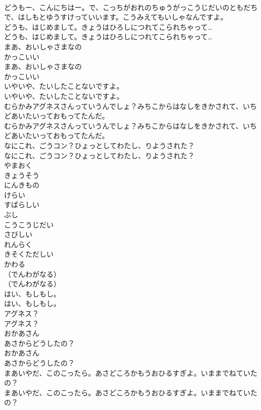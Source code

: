 \documentclass[8pt]{extreport}
\begin{document}
\begin{CJK}{UTF8}{min}
\\	どうもー、こんにちはー。で、こっちがおれのちゅうがっこうじだいのともだちで、はしもとゆうすけっていいます。こうみえてもいしゃなんですよ。
\\	どうも、はじめまして。きょうはひろしにつれてこられちゃって…
\\	どうも、はじめまして。きょうはひろしにつれてこられちゃって…
\\	まあ、おいしゃさまなの
\\	かっこいい
\\	まあ、おいしゃさまなの
\\	かっこいい
\\	いやいや、たいしたことないですよ。
\\	いやいや、たいしたことないですよ。
\\	むらかみアグネスさんっていうんでしょ？みちこからはなしをきかされて、いちどあいたいっておもってたんだ。
\\	むらかみアグネスさんっていうんでしょ？みちこからはなしをきかされて、いちどあいたいっておもってたんだ。
\\	なにこれ、ごうコン？ひょっとしてわたし、りようされた？
\\	なにこれ、ごうコン？ひょっとしてわたし、りようされた？
\\	やまおく
\\	きょうそう
\\	にんきもの
\\	けらい
\\	すばらしい
\\	ぶし
\\	こうこうじだい
\\	さびしい
\\	れんらく
\\	きそくただしい
\\	かわる
\\	（でんわがなる）
\\	（でんわがなる）
\\	はい、もしもし。
\\	はい、もしもし。
\\	アグネス？
\\	アグネス？
\\	おかあさん
\\	あさからどうしたの？
\\	おかあさん
\\	あさからどうしたの？
\\	まあいやだ、このこったら。あさどころかもうおひるすぎよ。いままでねていたの？
\\	まあいやだ、このこったら。あさどころかもうおひるすぎよ。いままでねていたの？

\end{CJK}
\end{document}
